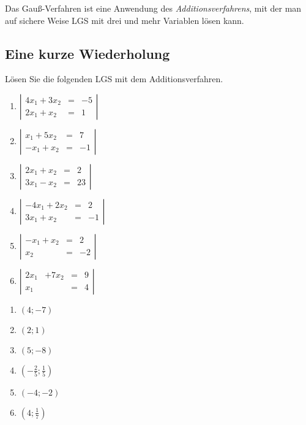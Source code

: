 \documentclass[12pt,a4paper,twoside,fleqn]{article}
\begin{document}
Das Gauß-Verfahren ist eine Anwendung des \emph{Additionsverfahrens}, mit der
man auf sichere Weise LGS mit drei und mehr Variablen lösen kann.
\subsection{Eine kurze Wiederholung}

\begin{question}%
  Lösen Sie die folgenden LGS mit dem Additionsverfahren.
  \begin{multicols}{3}
    \begin{enumerate}
    \item $
      \left|\begin{array}{rcl}
        4x_1+3x_2&=&-5 \\
        2x_1+x_2&=&1
      \end{array}\right|$
    \item 
      $\left|\begin{array}{rcl}
         x_1+5x_2&=&7 \\
         -x_1+x_2&=&-1
       \end{array}\right|$
     \item 
       $\left|\begin{array}{rcl}
          2x_1+x_2&=&2 \\
          3x_1-x_2&=&23
        \end{array}\right|$
      \item 
        $\left|\begin{array}{rcl}
          -4x_1+2x_2&=& 2\\
          3x_1+x_2&=&-1
        \end{array}\right|$
       \item 
        $\left|\begin{array}{rcl}
          -x_1+x_2&=& 2\\
           x_2&=&-2
        \end{array}\right|$
       \item 
        $\left|\begin{array}{rrcl}
          2x_1&+7x_2&=& 9\\
           x_1&&=&4
        \end{array}\right|$
      \end{enumerate}
    \end{multicols}
  \end{question}
  \begin{solution}
    \begin{multicols}{6}
    \begin{enumerate}
    \item $(4;-7)$
    \item $(2;1)$
    \item $(5;-8)$
    \item $(-\frac 2 5 ; \frac 1 5 )$
    \item $(-4;-2)$
    \item $(4;\frac 1 7)$
    \end{enumerate}
  \end{multicols}
\end{solution}
              
\end{document}
